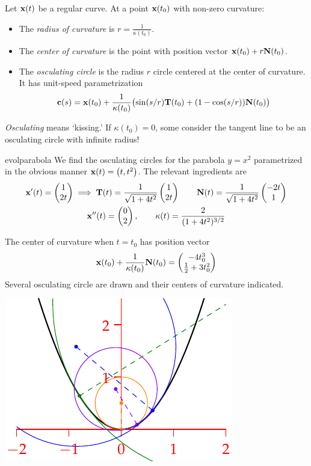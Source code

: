 \begin{defn}{}{}
Let ${\mathbf{x}}(t)$ be a regular curve. At a point ${\mathbf{x}}(t_0)$ with non-zero curvature:
\begin{itemize}\itemsep0pt
  \item The \emph{radius of curvature} is $r=\frac 1{\kappa(t_0)}$.
  \item The \emph{center of curvature} is the point with position vector ${\mathbf{x}}(t_0)+r{\mathbf{N}}(t_0)$.
	\item The \emph{osculating circle} is the radius $r$ circle centered at the center of curvature. It has unit-speed parametrization
	\[{\mathbf{c}}(s)={\mathbf{x}}(t_0)+\frac 1{\kappa(t_0)}\bigl(\sin(s/r){\mathbf{T}}(t_0)+(1-\cos(s/r)){\mathbf{N}}(t_0)\bigr)\]
\end{itemize}
\end{defn}

\emph{Osculating} means `kissing.' If $\kappa(t_0)=0$, some consider the tangent line to be an osculating circle with infinite radius!


\goodbreak

\begin{example}{}{evolparabola}
We find the osculating circles for the parabola $y=x^2$ parametrized in the obvious manner ${\mathbf{x}}(t)=\bigl(t,t^2\bigr)$. The relevant ingredients are
\begin{gather*}
{\mathbf{x}}'(t)=\begin{pmatrix}1\\2t\end{pmatrix}\implies {\mathbf{T}}(t)=\frac 1{\sqrt{1+4t^2}}\begin{pmatrix}1\\2t\end{pmatrix} \qquad {\mathbf{N}}(t)=\frac{1}{\sqrt{1+4t^2}}\begin{pmatrix}-2t\\1\end{pmatrix}\\
{\mathbf{x}}''(t)=\begin{pmatrix}0\\2\end{pmatrix},\qquad \kappa(t)=\frac 2{(1+4t^2)^{3/2}}
\end{gather*}
\begin{minipage}[t]{0.59\linewidth}\vspace{0pt}
The center of curvature when $t=t_0$ has position vector
\[\vx(t_0)+\frac{1}{\kappa(t_0)}\vN(t_0)=%
\twovec{-4t_0^3}{\frac 12+3t_0^2}\]
Several osculating circle are drawn and their centers of curvature indicated.
\end{minipage}\hfill
\begin{minipage}[t]{0.40\linewidth}\vspace{-35pt}
\flushright\includegraphics[scale=1]{radii-osculating3}
\end{minipage}
\end{example}



